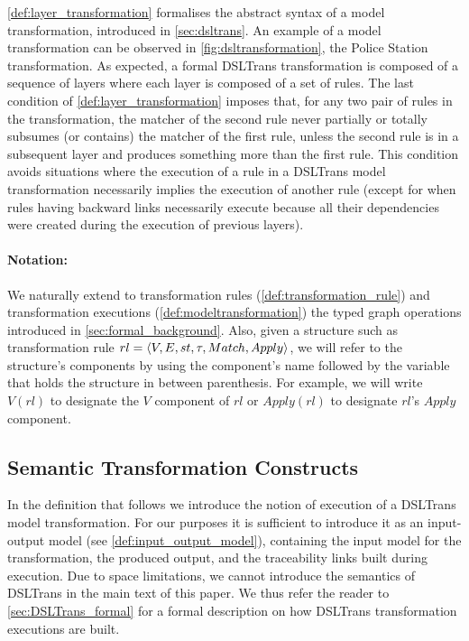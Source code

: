 

\cref{def:layer_transformation} formalises the abstract syntax of a model transformation, introduced in \cref{sec:dsltrans}. An example of a model transformation can be observed in \cref{fig:dsltransformation}, the Police Station transformation. As expected, a formal DSLTrans transformation is composed of a sequence of layers where each layer is composed of a set of rules. The last condition of \cref{def:layer_transformation} imposes that, for any two pair of rules in the transformation, the matcher of the second rule never partially or totally subsumes (or contains) the matcher of the first rule, unless the second rule is in a subsequent layer and produces something more than the first rule. This condition avoids situations where the execution of a rule in a DSLTrans model transformation necessarily implies the execution of another rule (except for when rules having backward links necessarily execute because all their dependencies were created during the execution of previous layers). 

\paragraph{\textbf{Notation:}}


We naturally extend to transformation rules (\cref{def:transformation_rule}) and transformation executions (\cref{def:modeltransformation}) the typed graph operations introduced in \cref{sec:formal_background}.  Also, given a structure such as transformation rule $rl = \langle V,E,st,\tau,Match,\\Apply\rangle$, we will refer to the structure's components by using the component's name followed by the variable that holds the structure in between parenthesis. For example, we will write $V(rl)$ to designate the $V$ component of $rl$ or $Apply(rl)$ to designate $rl$'s $Apply$ component.


\subsection{Semantic Transformation Constructs}
\label{sec:DSLTrans_semantics}

In the definition that follows we introduce the notion of execution of a DSLTrans model transformation. For our purposes it is sufficient to introduce it as an input-output model (see \cref{def:input_output_model}), containing the input model for the transformation, the produced output, and the traceability links built during execution. Due to space limitations, we cannot introduce the semantics of DSLTrans in the main text of this paper. We thus refer the reader to \cref{sec:DSLTrans_formal} for a formal description on how DSLTrans transformation executions are built. 

